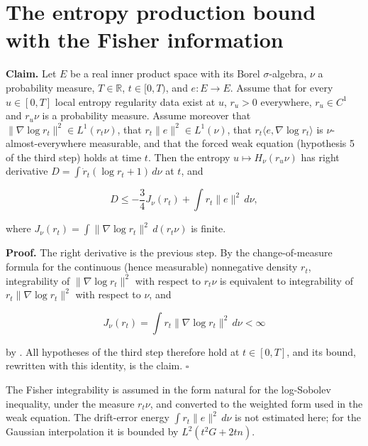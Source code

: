 \documentclass[11pt,a4paper]{article}
\begin{document}
\section{\texorpdfstring{The entropy production bound with the Fisher information}{The entropy production bound with the Fisher information}}


\textbf{Claim.} Let \(E\) be a real inner product space with its Borel \(\sigma\)-algebra, \(\nu\) a probability measure, \(T\in\mathbb R\), \(t\in[0,T)\), and \(e:E\to E\). Assume that for every \(u\in[0,T]\) local entropy regularity data exist at \(u\), \(r_u>0\) everywhere, \(r_u\in C^1\) and \(r_u\nu\) is a probability measure. Assume moreover that \(\|\nabla\log r_t\|^2\in L^1(r_t\nu)\), that \(r_t\|e\|^2\in L^1(\nu)\), that \(r_t\langle e,\nabla\log r_t\rangle\) is \(\nu\)-almost-everywhere measurable, and that the forced weak equation (hypothesis 5 of the third step) holds at time \(t\). Then the entropy \(u\mapsto H_\nu(r_u\nu)\) has right derivative \(D=\int\dot r_t(\log r_t+1)\,d\nu\) at \(t\), and


\[D\le-\frac34J_\nu(r_t)+\int r_t\|e\|^2\,d\nu,\]


where \(J_\nu(r_t)=\int\|\nabla\log r_t\|^2\,d(r_t\nu)\) is finite.




\textbf{Proof.} The right derivative is the previous step. By the change-of-measure formula \cite[Section~3.4.1]{LangevinLean2026ULALSI} for the continuous (hence measurable) nonnegative density \(r_t\), integrability of \(\|\nabla\log r_t\|^2\) with respect to \(r_t\nu\) is equivalent to integrability of \(r_t\|\nabla\log r_t\|^2\) with respect to \(\nu\), and


\[J_\nu(r_t)=\int r_t\|\nabla\log r_t\|^2\,d\nu<\infty\]


by \cite[Section~3.4.7]{LangevinLean2026ULALSI}. All hypotheses of the third step therefore hold at \(t\in[0,T]\), and its bound, rewritten with this identity, is the claim. \(\square\)




The Fisher integrability is assumed in the form natural for the log-Sobolev inequality, under the measure \(r_t\nu\), and converted to the weighted form used in the weak equation. The drift-error energy \(\int r_t\|e\|^2\,d\nu\) is not estimated here; for the Gaussian interpolation it is bounded by \(L^2(t^2G+2tn)\).
\end{document}
